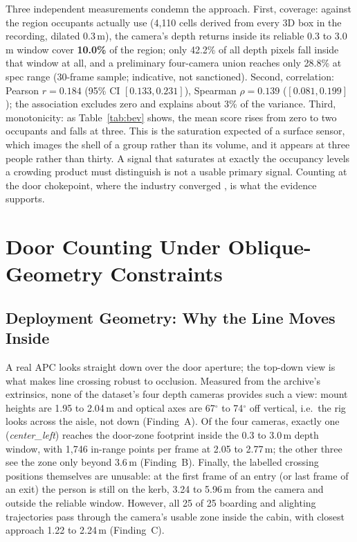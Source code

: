 \documentclass[conference]{IEEEtran}
\begin{document}
Three independent measurements condemn the approach. First, coverage: against
the region occupants actually use (4{,}110 cells derived from every 3D box in
the recording, dilated 0.3\,m), the camera's depth returns inside its reliable
0.3 to 3.0\,m window cover \textbf{10.0\%} of the region; only 42.2\% of all
depth pixels fall inside that window at all, and a preliminary four-camera
union reaches only 28.8\% at spec range (30-frame sample; indicative, not
sanctioned). Second, correlation: Pearson $r=0.184$ (95\% CI $[0.133,
0.231]$), Spearman $\rho=0.139$ ($[0.081, 0.199]$); the association excludes
zero and explains about 3\% of the variance. Third, monotonicity: as
Table~\ref{tab:bev} shows, the mean score rises from zero to two occupants and
falls at three. This is the saturation expected of a surface sensor, which
images the shell of a group rather than its volume, and it appears at three
people rather than thirty. A signal that saturates at exactly the occupancy
levels a crowding product must distinguish is not a usable primary signal.
Counting at the door chokepoint, where the industry converged
\cite{irma,dilax,yahiaoui2010,seidel2021}, is what the evidence supports.

\section{Door Counting Under Oblique-Geometry Constraints}
\label{sec:method}

\subsection{Deployment Geometry: Why the Line Moves Inside}
\label{sec:geometry}

A real APC looks straight down over the door aperture; the top-down view is
what makes line crossing robust to occlusion. Measured from the archive's
extrinsics, none of the dataset's four depth cameras provides such a view:
mount heights are 1.95 to 2.04\,m and optical axes are 67$^\circ$ to
74$^\circ$ off vertical, i.e.\ the rig looks across the aisle, not down
(Finding~A). Of the four cameras, exactly one (\emph{center\_left}) reaches
the door-zone footprint inside the 0.3 to 3.0\,m depth window, with 1{,}746
in-range points per frame at 2.05 to 2.77\,m; the other three see the
zone only beyond 3.6\,m (Finding~B). Finally, the labelled crossing positions
themselves are unusable: at the first frame of an entry (or last frame of an
exit) the person is still on the kerb, 3.24 to 5.96\,m from the camera and
outside the reliable window. However, all 25 of 25 boarding and alighting
trajectories pass through the camera's usable zone inside the cabin, with
closest approach 1.22 to 2.24\,m (Finding~C).
\end{document}
